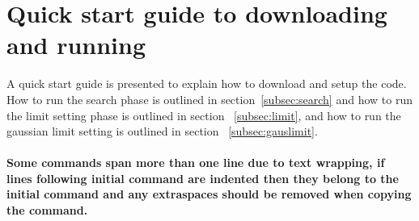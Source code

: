 \documentclass[UKenglish]{latex/atlasdoc}
\begin{document}
\section{Quick start guide to downloading and running }
\label{sec:quickstart}
A quick start guide is presented to explain how to download and setup the code. How to run the search phase is outlined in section~\ref{subsec:search} and how to run the limit setting phase is outlined in section ~\ref{subsec:limit}, and how to run the gaussian limit setting is outlined in section ~\ref{subsec:gauslimit}. 
\\\\\textbf{Some commands span more than one line due to text wrapping, if lines following initial command are indented then they belong to the initial command and any extraspaces should be removed when copying the command.}
\end{document}
